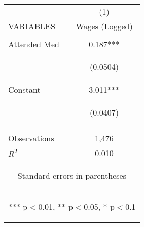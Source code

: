 \begin{center}
\begin{tabular}{lc} \hline
 & (1) \\
VARIABLES & Wages (Logged) \\ \hline
\vspace{4pt} & \begin{footnotesize}\end{footnotesize} \\
Attended Med & 0.187*** \\
\vspace{4pt} & \begin{footnotesize}(0.0504)\end{footnotesize} \\
Constant & 3.011*** \\
 & \begin{footnotesize}(0.0407)\end{footnotesize} \\
\vspace{4pt} & \begin{footnotesize}\end{footnotesize} \\
Observations & 1,476 \\
 $R^2$ & 0.010 \\ \hline
\multicolumn{2}{c}{\begin{footnotesize} Standard errors in parentheses\end{footnotesize}} \\
\multicolumn{2}{c}{\begin{footnotesize} *** p$<$0.01, ** p$<$0.05, * p$<$0.1\end{footnotesize}} \\
\end{tabular}
\end{center}
